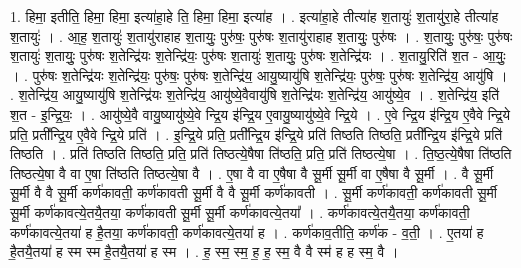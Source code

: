 \documentclass[17pt]{extarticle}
\begin{document}
1. हिमा॒ इतीति॒ हिमा॒ हिमा॒ इत्या॑हा॒हे ति॒ हिमा॒ हिमा॒ इत्या॑ह । . इत्या॑हा॒हे तीत्या॑ह श॒तायुः॑ श॒तायु॑रा॒हे तीत्या॑ह श॒तायुः॑ । . आ॒ह॒ श॒तायुः॑ श॒तायु॑राहाह श॒तायुः॒ पुरु॑षः॒ पुरु॑षः श॒तायु॑राहाह श॒तायुः॒ पुरु॑षः । . श॒तायुः॒ पुरु॑षः॒ पुरु॑षः श॒तायुः॑ श॒तायुः॒ पुरु॑षः श॒तेन्द्रि॑यः श॒तेन्द्रि॑यः॒ पुरु॑षः श॒तायुः॑ श॒तायुः॒ पुरु॑षः श॒तेन्द्रि॑यः । . श॒तायु॒रिति॑ श॒त - आ॒युः॒ । . पुरु॑षः श॒तेन्द्रि॑यः श॒तेन्द्रि॑यः॒ पुरु॑षः॒ पुरु॑षः श॒तेन्द्रि॑य॒ आयु॒ष्यायु॑षि श॒तेन्द्रि॑यः॒ पुरु॑षः॒ पुरु॑षः श॒तेन्द्रि॑य॒ आयु॑षि । . श॒तेन्द्रि॑य॒ आयु॒ष्यायु॑षि श॒तेन्द्रि॑यः श॒तेन्द्रि॑य॒ आयु॑ष्ये॒वैवायु॑षि श॒तेन्द्रि॑यः श॒तेन्द्रि॑य॒ आयु॑ष्ये॒व । . श॒तेन्द्रि॑य॒ इति॑ श॒त - इ॒न्द्रि॒यः॒ । . आयु॑ष्ये॒वै वायु॒ष्यायु॑ष्ये॒वे न्द्रि॒य इ॑न्द्रि॒य ए॒वायु॒ष्यायु॑ष्ये॒वे न्द्रि॒ये । . ए॒वे न्द्रि॒य इ॑न्द्रि॒य ए॒वैवे न्द्रि॒ये प्रति॒ प्रती᳚न्द्रि॒य ए॒वैवे न्द्रि॒ये प्रति॑ । . इ॒न्द्रि॒ये प्रति॒ प्रती᳚न्द्रि॒य इ॑न्द्रि॒ये प्रति॑ तिष्ठति तिष्ठति॒ प्रती᳚न्द्रि॒य इ॑न्द्रि॒ये प्रति॑ तिष्ठति । . प्रति॑ तिष्ठति तिष्ठति॒ प्रति॒ प्रति॑ तिष्ठत्ये॒षैषा ति॑ष्ठति॒ प्रति॒ प्रति॑ तिष्ठत्ये॒षा । . ति॒ष्ठ॒त्ये॒षैषा ति॑ष्ठति तिष्ठत्ये॒षा वै वा ए॒षा ति॑ष्ठति तिष्ठत्ये॒षा वै । . ए॒षा वै वा ए॒षैषा वै सू॒र्मी सू॒र्मी वा ए॒षैषा वै सू॒र्मी । . वै सू॒र्मी सू॒र्मी वै वै सू॒र्मी कर्ण॑कावती॒ कर्ण॑कावती सू॒र्मी वै वै सू॒र्मी कर्ण॑कावती । . सू॒र्मी कर्ण॑कावती॒ कर्ण॑कावती सू॒र्मी सू॒र्मी कर्ण॑कावत्ये॒तयै॒तया॒ कर्ण॑कावती सू॒र्मी सू॒र्मी कर्ण॑कावत्ये॒तया᳚ । . कर्ण॑कावत्ये॒तयै॒तया॒ कर्ण॑कावती॒ कर्ण॑कावत्ये॒तया॑ ह है॒तया॒ कर्ण॑कावती॒ कर्ण॑कावत्ये॒तया॑ ह । . कर्ण॑काव॒तीति॒ कर्ण॑क - व॒ती॒ । . ए॒तया॑ ह है॒तयै॒तया॑ ह स्म स्म है॒तयै॒तया॑ ह स्म । . ह॒ स्म॒ स्म॒ ह॒ ह॒ स्म॒ वै वै स्म॑ ह ह स्म॒ वै । \newline
\end{document}
